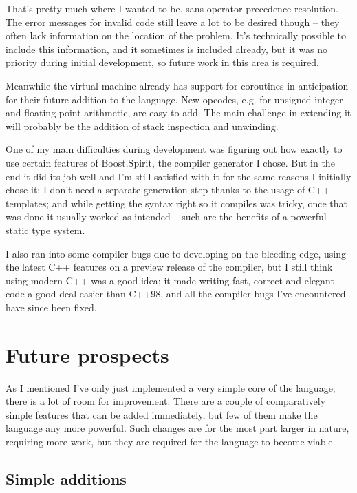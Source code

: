 That's pretty much where I wanted to be, sans operator precedence resolution. The error messages for invalid code still leave a lot to be desired though -- they often lack information on the location of the problem. It's technically possible to include this information, and it sometimes is included already, but it was no priority during initial development, so future work in this area is required.

Meanwhile the virtual machine already has support for coroutines in anticipation for their future addition to the language. New opcodes, e.g. for unsigned integer and floating point arithmetic, are easy to add. The main challenge in extending it will probably be the addition of stack inspection and unwinding.

One of my main difficulties during development was figuring out how exactly to use certain features of Boost.Spirit, the compiler generator I chose. But in the end it did its job well and I'm still satisfied with it for the same reasons I initially chose it: I don't need a separate generation step thanks to the usage of C++ templates; and while getting the syntax right so it compiles was tricky, once that was done it usually worked as intended -- such are the benefits of a powerful static type system.

I also ran into some compiler bugs due to developing on the bleeding edge, using the latest C++ features on a preview release of the compiler, but I still think using modern C++ was a good idea; it made writing fast, correct and elegant code a good deal easier than C++98, and all the compiler bugs I've encountered have since been fixed.

\chapter{Future prospects}

As I mentioned I've only just implemented a very simple core of the language; there is a lot of room for improvement. There are a couple of comparatively simple features that can be added immediately, but few of them make the language any more powerful. Such changes are for the most part larger in nature, requiring more work, but they are required for the language to become viable.

    \section{Simple additions}
    
